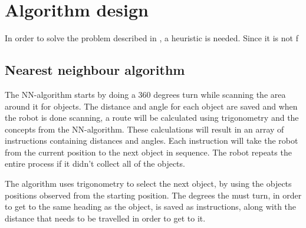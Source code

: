 \section{Algorithm design} \label{sec:algorithm-design}


In order to solve the problem described in , a heuristic is needed. Since it is not f





\subsection{Nearest neighbour algorithm} \label{sec:nn-algorithm}
The NN-algorithm starts by doing a 360 degrees turn while scanning the area around it for objects. The distance and angle for each object are saved and when the robot is done scanning, a route will be calculated using trigonometry and the concepts from the NN-algorithm. These calculations will result in an array of instructions containing distances and angles. Each instruction will take the robot from the current position to the next object in sequence. The robot repeats the entire process if it didn't collect all of the objects.

The algorithm uses trigonometry to select the next object, by using the objects positions observed from the starting position. The degrees the \projname{} must turn, in order to get to the same heading as the object, is saved as instructions, along with the distance that needs to be travelled in order to get to it. 

